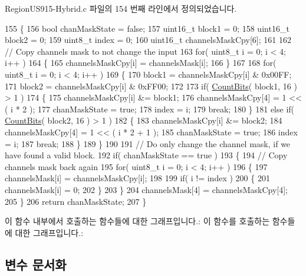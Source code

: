 Region\+U\+S915-\/\+Hybrid.\+c 파일의 154 번째 라인에서 정의되었습니다.


\begin{DoxyCode}
155 \{
156     \textcolor{keywordtype}{bool} chanMaskState = \textcolor{keyword}{false};
157     uint16\_t block1 = 0;
158     uint16\_t block2 = 0;
159     uint8\_t index = 0;
160     uint16\_t channelsMaskCpy[6];
161 
162     \textcolor{comment}{// Copy channels mask to not change the input}
163     \textcolor{keywordflow}{for}( uint8\_t i = 0; i < 4; i++ )
164     \{
165         channelsMaskCpy[i] = channelsMask[i];
166     \}
167 
168     \textcolor{keywordflow}{for}( uint8\_t i = 0; i < 4; i++ )
169     \{
170         block1 = channelsMaskCpy[i] & 0x00FF;
171         block2 = channelsMaskCpy[i] & 0xFF00;
172 
173         \textcolor{keywordflow}{if}( \mbox{\hyperlink{_region_u_s915-_hybrid_8c_a8628e96fecf706f9925739e9c91535e7}{CountBits}}( block1, 16 ) > 1 )
174         \{
175             channelsMaskCpy[i] &= block1;
176             channelsMaskCpy[4] = 1 << ( i * 2 );
177             chanMaskState = \textcolor{keyword}{true};
178             index = i;
179             \textcolor{keywordflow}{break};
180         \}
181         \textcolor{keywordflow}{else} \textcolor{keywordflow}{if}( \mbox{\hyperlink{_region_u_s915-_hybrid_8c_a8628e96fecf706f9925739e9c91535e7}{CountBits}}( block2, 16 ) > 1 )
182         \{
183             channelsMaskCpy[i] &= block2;
184             channelsMaskCpy[4] = 1 << ( i * 2 + 1 );
185             chanMaskState = \textcolor{keyword}{true};
186             index = i;
187             \textcolor{keywordflow}{break};
188         \}
189     \}
190 
191     \textcolor{comment}{// Do only change the channel mask, if we have found a valid block.}
192     \textcolor{keywordflow}{if}( chanMaskState == \textcolor{keyword}{true} )
193     \{
194         \textcolor{comment}{// Copy channels mask back again}
195         \textcolor{keywordflow}{for}( uint8\_t i = 0; i < 4; i++ )
196         \{
197             channelsMask[i] = channelsMaskCpy[i];
198 
199             \textcolor{keywordflow}{if}( i != index )
200             \{
201                 channelsMask[i] = 0;
202             \}
203         \}
204         channelsMask[4] = channelsMaskCpy[4];
205     \}
206     \textcolor{keywordflow}{return} chanMaskState;
207 \}
\end{DoxyCode}
이 함수 내부에서 호출하는 함수들에 대한 그래프입니다.\+:
이 함수를 호출하는 함수들에 대한 그래프입니다.\+:


\subsection{변수 문서화}
\mbox{\label{_region_u_s915-_hybrid_8c_acdf8c87a5e1e73b468dbf151f92e2273}} 
